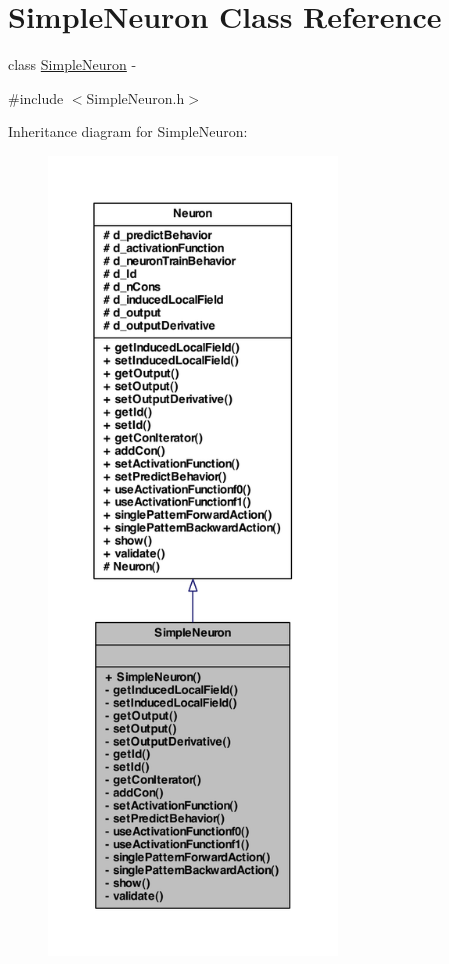 \hypertarget{class_simple_neuron}{
\section{SimpleNeuron Class Reference}
\label{class_simple_neuron}
}


class \hyperlink{class_simple_neuron}{SimpleNeuron} -\/  




{\ttfamily \#include $<$SimpleNeuron.h$>$}



Inheritance diagram for SimpleNeuron:\nopagebreak
\begin{figure}[H]
\begin{center}
\leavevmode
\includegraphics[height=600pt]{class_simple_neuron__inherit__graph}
\end{center}
\end{figure}



